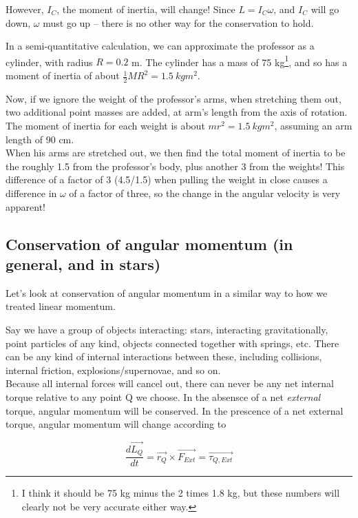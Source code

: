\documentclass[12pt,a4paper]{report}
\begin{document}
However, $I_C$, the moment of inertia, will change! Since $L = I_C \omega$, and $I_C$ will go down, $\omega$ must go up -- there is no other way for the conservation to hold.

In a semi-quantitative calculation, we can approximate the professor as a cylinder, with radius $R = 0.2$ m. The cylinder has a mass of 75 kg\footnote{I think it should be 75 kg minus the 2 times 1.8 kg, but these numbers will clearly not be very accurate either way.}, and so has a moment of inertia of about $\frac{1}{2} M R^2 = \SI{1.5}{kg m^2}$.

Now, if we ignore the weight of the professor's arms, when stretching them out, two additional point masses are added, at arm's length from the axis of rotation. The moment of inertia for each weight is about $m r^2 = \SI{1.5}{kg m^2}$, assuming an arm length of 90 cm.\\
When his arms are stretched out, we then find the total moment of inertia to be the roughly 1.5 from the professor's body, plus another 3 from the weights! This difference of a factor of 3 (4.5/1.5) when pulling the weight in close causes a difference in $\omega$ of a factor of three, so the change in the angular velocity is very apparent!

\subsection{Conservation of angular momentum (in general, and in stars)}

Let's look at conservation of angular momentum in a similar way to how we treated linear momentum.

Say we have a group of objects interacting: stars, interacting gravitationally, point particles of any kind, objects connected together with springs, etc. There can be any kind of internal interactions between these, including collisions, internal friction, explosions/supernovae, and so on.\\
Because all internal forces will cancel out, there can never be any net internal torque relative to any point Q we choose. In the absensce of a net \emph{external} torque, angular momentum will be conserved. In the prescence of a net external torque, angular momentum will change according to

\begin{equation}
\frac{d\vec{L_Q}}{dt} = \vec{r_Q} \times \vec{F_{Ext}} = \vec{\tau_{Q,Ext}}
\end{equation}
\end{document}
